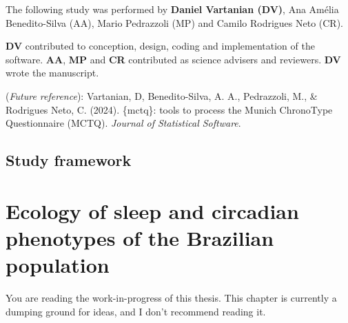\documentclass[
  12pt,
  a4paper,
  oneside]{tesesusp}
\begin{document}
\begin{tcolorbox}[enhanced jigsaw, breakable, colback=white, colbacktitle=quarto-callout-note-color!10!white, leftrule=.75mm, left=2mm, toprule=.15mm, opacityback=0, rightrule=.15mm, title=\textcolor{quarto-callout-note-color}{\faInfo}\hspace{0.5em}{Note}, opacitybacktitle=0.6, bottomtitle=1mm, titlerule=0mm, toptitle=1mm, coltitle=black, colframe=quarto-callout-note-color-frame, bottomrule=.15mm, arc=.35mm]

The following study was performed by \textbf{Daniel Vartanian (DV)}, Ana
Amélia Benedito-Silva (AA), Mario Pedrazzoli (MP) and Camilo Rodrigues
Neto (CR).

\textbf{DV} contributed to conception, design, coding and implementation
of the software. \textbf{AA}, \textbf{MP} and \textbf{CR} contributed as
science advisers and reviewers. \textbf{DV} wrote the manuscript.

(\emph{Future reference}): Vartanian, D, Benedito-Silva, A. A.,
Pedrazzoli, M., \& Rodrigues Neto, C. (2024). \{mctq\}: tools to process
the Munich ChronoType Questionnaire (MCTQ). \emph{Journal of Statistical
Software}.

\end{tcolorbox}

\vspace{10pt}

\hypertarget{study-framework-1}{%
\section{Study framework}\label{study-framework-1}}

\hypertarget{ecology-of-sleep-and-circadian-phenotypes-of-the-brazilian-population}{%
\chapter{Ecology of sleep and circadian phenotypes of the Brazilian
population}\label{ecology-of-sleep-and-circadian-phenotypes-of-the-brazilian-population}}

\begin{tcolorbox}[enhanced jigsaw, breakable, colback=white, colbacktitle=quarto-callout-important-color!10!white, leftrule=.75mm, left=2mm, toprule=.15mm, opacityback=0, rightrule=.15mm, title=\textcolor{quarto-callout-important-color}{\faExclamation}\hspace{0.5em}{Important}, opacitybacktitle=0.6, bottomtitle=1mm, titlerule=0mm, toptitle=1mm, coltitle=black, colframe=quarto-callout-important-color-frame, bottomrule=.15mm, arc=.35mm]

You are reading the work-in-progress of this thesis. This chapter is
currently a dumping ground for ideas, and I don't recommend reading it.

\end{tcolorbox}
\end{document}
